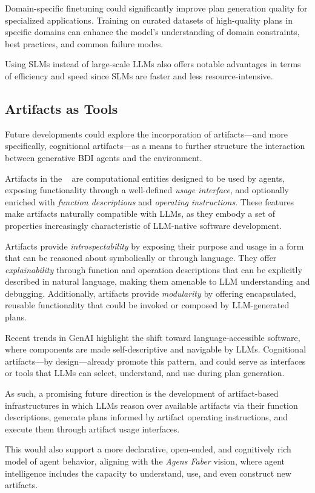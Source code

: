 \documentclass[12pt,a4paper,openright,twoside]{book}
\begin{document}
Domain-specific finetuning could significantly improve plan generation quality for specialized applications. 
%
Training on curated datasets of high-quality plans in specific domains can enhance the model's understanding of domain constraints, best practices, and common failure modes.

Using \acp{SLM} instead of large-scale \acp{LLM} also offers notable advantages in terms of efficiency and speed since \acp{SLM} are faster and less resource-intensive.

\subsection{Artifacts as Tools}\label{sec:artifacts}

Future developments could explore the incorporation of artifacts---and more specifically, cognitional artifacts---as a means to further structure the interaction between generative \ac{BDI} agents and the environment.

Artifacts in the \aaa{}~\cite{omiciniArtifactsAAMetamodel2008} are computational entities designed to be used by agents, exposing functionality through a well-defined \textit{usage interface}, and optionally enriched with \textit{function descriptions} and \textit{operating instructions}.
%
These features make artifacts naturally compatible with \acp{LLM}, as they embody a set of properties increasingly characteristic of \ac{LLM}-native software development.

Artifacts provide \textit{introspectability} by exposing their purpose and usage in a form that can be reasoned about symbolically or through language.
%
They offer \textit{explainability} through function and operation descriptions that can be explicitly described in natural language, making them amenable to \ac{LLM} understanding and debugging. 
%
Additionally, artifacts provide \textit{modularity} by offering encapsulated, reusable functionality that could be invoked or composed by \ac{LLM}-generated plans.

Recent trends in GenAI highlight the shift toward language-accessible software, where components are made self-descriptive and navigable by \acp{LLM}. 
%
Cognitional artifacts---by design---already promote this pattern, and could serve as interfaces or tools that \acp{LLM} can select, understand, and use during plan generation.

As such, a promising future direction is the development of artifact-based infrastructures in which \acp{LLM} reason over available artifacts via their function descriptions, generate plans informed by artifact operating instructions, and execute them through artifact usage interfaces.

This would also support a more declarative, open-ended, and cognitively rich model of agent behavior, aligning with the \textit{Agens Faber} vision, where agent intelligence includes the capacity to understand, use, and even construct new artifacts.


\backmatter%
\printbibliography[heading=bibintoc]%
\end{document}
